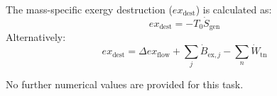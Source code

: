 The mass-specific exergy destruction (\( ex_{\text{dest}} \)) is calculated as:  
\[
ex_{\text{dest}} = -T_0 \dot{S}_{\text{gen}}
\]  
Alternatively:  
\[
ex_{\text{dest}} = \Delta ex_{\text{flow}} + \sum_j \dot{B}_{\text{ex},j} - \sum_n \dot{W}_{\text{tn}}
\]  

No further numerical values are provided for this task.